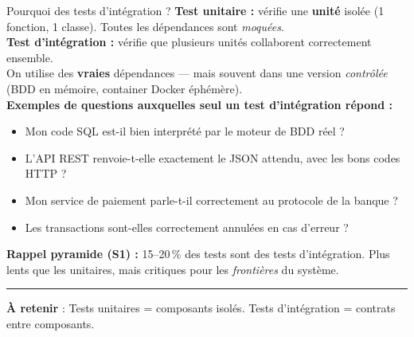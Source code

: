 \documentclass[aspectratio=169,11pt]{beamer}
\newcommand{\takeaway}[1]{%
\vfill\begin{beamercolorbox}[wd=\linewidth,sep=0.4em]{}
\color{accent2}\rule[0.6ex]{1.2em}{1.2pt}\hspace{0.4em}%
\textbf{\color{accent2}\small À retenir} \textcolor{textsoft}{:} %
{\small\color{textmain}#1}
\end{beamercolorbox}}
\begin{document}
\begin{frame}[t]{Pourquoi des tests d'intégration ?}
\footnotesize
\textbf{Test unitaire :} vérifie une \textbf{unité} isolée (1 fonction, 1 classe). Toutes les dépendances sont \emph{moquées}.\\[0.4em]

\textbf{Test d'intégration :} vérifie que plusieurs unités collaborent correctement ensemble. \\
On utilise des \textbf{vraies} dépendances --- mais souvent dans une version \emph{contrôlée} (BDD en mémoire, container Docker éphémère).\\[0.5em]

\textbf{Exemples de questions auxquelles seul un test d'intégration répond :}
\begin{itemize}\itemsep0.08em
\item Mon code SQL est-il bien interprété par le moteur de BDD réel ?
\item L'API REST renvoie-t-elle exactement le JSON attendu, avec les bons codes HTTP ?
\item Mon service de paiement parle-t-il correctement au protocole de la banque ?
\item Les transactions sont-elles correctement annulées en cas d'erreur ?
\end{itemize}
\vspace{0.4cm}
\textbf{Rappel pyramide (S1) :} 15--20\,\% des tests sont des tests d'intégration. Plus lents que les unitaires, mais critiques pour les \emph{frontières} du système.
\takeaway{Tests unitaires = composants isolés. Tests d'intégration = contrats entre composants.}
\end{frame}
\end{document}
